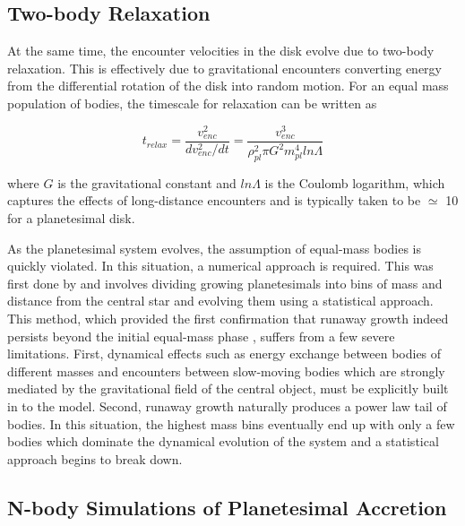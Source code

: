 \subsection{Two-body Relaxation}

At the same time, the encounter velocities in the disk evolve due to two-body relaxation. This is effectively due to gravitational encounters converting energy from the differential rotation of the disk into random motion. For an equal mass population of bodies, the timescale for relaxation can be written as 

\begin{equation}\label{eq:relax}
	t_{relax} = \frac{v_{enc}^2}{d v_{enc}^2 / dt} = \frac{v_{enc}^3}{\rho_{pl}^2 \pi G^{2} m_{pl}^4 ln \Lambda}
\end{equation}

\noindent where $G$ is the gravitational constant and $ln \Lambda$ is the Coulomb logarithm, which captures the effects of long-distance encounters and is typically taken to be $\simeq$ 10 for a planetesimal disk.

As the planetesimal system evolves, the assumption of equal-mass bodies is quickly violated. In this situation, a numerical approach is required. This was first done by \cite{greenberg78} and involves dividing growing planetesimals into bins of mass and distance from the central star and evolving them using a statistical approach. This method, which provided the first confirmation that runaway growth indeed persists beyond the initial equal-mass phase \cite{wetherill89}, suffers from a few severe limitations. First, dynamical effects such as energy exchange between bodies of different masses and encounters between slow-moving bodies which are strongly mediated by the gravitational field of the central object, must be explicitly built in to the model. Second, runaway growth naturally produces a power law tail of bodies. In this situation, the highest mass bins eventually end up with only a few bodies which dominate the dynamical evolution of the system and a statistical approach begins to break down.

\subsection{N-body Simulations of Planetesimal Accretion} \label{sec:nbodyPl}

